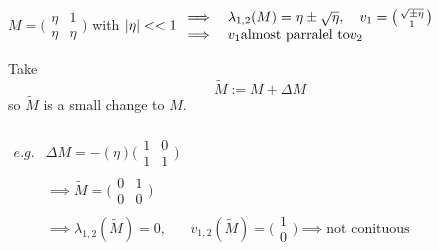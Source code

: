 \begin{SolutionSheet}[\ref{sheet2}]
\begin{Solution}
  \end{Solution}

  \begin{Solution} 
    $M = \big(\begin{smallmatrix}
      \eta & 1\\
      \eta & \eta
    \end{smallmatrix}\big)$ with $|\eta| << 1 \\
    \begin{array}{ll}
      \implies & \lambda_{1,2}(M) = \eta \pm \sqrt{\eta}, \quad v_1 = \big(\begin{smallmatrix} \sqrt{\pm\eta} \\
        1 \end{smallmatrix} \big) \\
      \implies & v_1 \text{almost parralel to} v_2 
    \end{array}$
    
    Take \begin{equation*} \widetilde{M} := M + \Delta M \end{equation*}
    so $\widetilde{M}$ is a small change to $M$. \\
    \\
    $\begin{array}{lll} 
      e.g. &\Delta M = -(\eta) \bigl( \begin{smallmatrix} 1 & 0 \\ 1&1 \end{smallmatrix} \bigr) \\
      &\implies \widetilde{M} = \bigl( \begin{smallmatrix} 0 & 1 \\ 0&0 \end{smallmatrix} \bigr) \\
      &\implies \lambda_{1,2}(\widetilde{M}) = 0, \
      &v_{1,2}(\widetilde{M}) = \bigl( \begin{smallmatrix} 1 \\ 0  \end{smallmatrix} \bigr) \implies \text{not conituous}
    \end{array}$
  \end{Solution}


\end{SolutionSheet}
